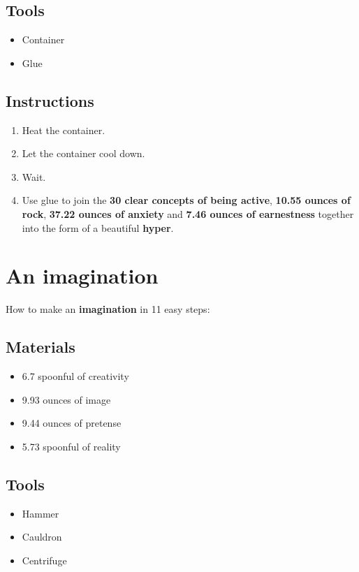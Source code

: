 \documentclass{article}
\begin{document}
\subsection{Tools}\begin{itemize}
\item 
Container
\item 
Glue
\end{itemize}
\subsection{Instructions}\begin{enumerate}
\item 
Heat the container.
\item 
Let the container cool down.
\item 
Wait.
\item 
Use glue to join the \textbf{30 clear concepts of being active}, \textbf{10.55 ounces of rock}, \textbf{37.22 ounces of anxiety} and \textbf{7.46 ounces of earnestness} together into the form of a beautiful \textbf{hyper}.
\end{enumerate}
\newpage
\section{An imagination}How to make an \textbf{imagination} in 11 easy steps:

\subsection{Materials}\begin{itemize}
\item 
6.7 spoonful of creativity
\item 
9.93 ounces of image
\item 
9.44 ounces of pretense
\item 
5.73 spoonful of reality
\end{itemize}
\subsection{Tools}\begin{itemize}
\item 
Hammer
\item 
Cauldron
\item 
Centrifuge
\end{itemize}
\end{document}
